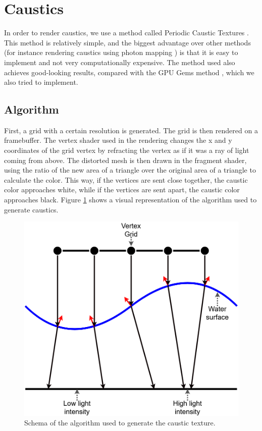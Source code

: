 \documentclass{article}
\begin{document}
\newpage
\section{Caustics}
\label{sec:caustics}

In order to render caustics, we use a method called Periodic Caustic Textures \cite{periodic_caustic_textures}. 
This method is relatively simple, and the biggest advantage over other methods (for instance rendering caustics 
using photon mapping \cite{caustics_photon_mapping}) is that it is easy to implement and not very 
computationally expensive. The method used also achieves good-looking results, 
compared with the GPU Gems method \cite{caustics_gpu_gems}, which we also tried to implement.

\subsection{Algorithm}
First, a grid with a certain resolution is generated. The grid is then rendered on a framebuffer. 
The vertex shader used in the rendering changes the x and y coordinates of the grid vertex by refracting 
the vertex as if it was a ray of light coming from above. The distorted mesh is then drawn in the fragment 
shader, using the ratio of the new area of a triangle over the original area of a triangle to calculate the 
color. This way, if the vertices are sent close together, the caustic color approaches white, while if the 
vertices are sent apart, the caustic color approaches black.
Figure \ref{fig:caustic_algorithm} shows a visual representation of the algorithm used to generate caustics.

\begin{figure}[h]
	\centering
	\includegraphics[width=.9\columnwidth]{imgs/caustic_algorithm.png}
	\caption{Schema of the algorithm used to generate the caustic texture.}
	\label{fig:caustic_algorithm}
\end{figure}
\end{document}
